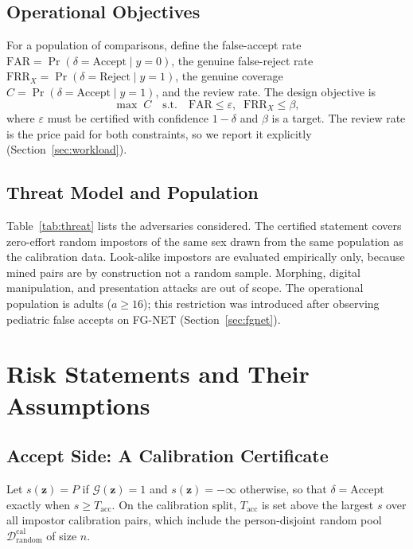 \documentclass[journal]{IEEEtran}
\newcommand{\vect}[1]{\mathbf{#1}}
\begin{document}
\subsection{Operational Objectives}
For a population of comparisons, define the false-accept rate $\text{FAR}=\Pr(\delta=\text{Accept}\mid y=0)$, the genuine false-reject rate $\text{FRR}_X=\Pr(\delta=\text{Reject}\mid y=1)$, the genuine coverage $C=\Pr(\delta=\text{Accept}\mid y=1)$, and the review rate. The design objective is
\begin{equation}
\label{eq:objective}
\max\; C \quad \text{s.t.}\quad \text{FAR}\le\varepsilon,\;\; \text{FRR}_X\le\beta ,
\end{equation}
where $\varepsilon$ must be certified with confidence $1-\delta$ and $\beta$ is a target. The review rate is the price paid for both constraints, so we report it explicitly (Section~\ref{sec:workload}).

\subsection{Threat Model and Population}
Table~\ref{tab:threat} lists the adversaries considered. The certified statement covers zero-effort random impostors of the same sex drawn from the same population as the calibration data. Look-alike impostors are evaluated empirically only, because mined pairs are by construction not a random sample. Morphing, digital manipulation, and presentation attacks are out of scope. The operational population is adults ($a\ge16$); this restriction was introduced after observing pediatric false accepts on FG-NET (Section~\ref{sec:fgnet}).



\section{Risk Statements and Their Assumptions}
\label{sec:risk}

\subsection{Accept Side: A Calibration Certificate}
Let $s(\vect{z})=P$ if $\mathcal{G}(\vect{z})=1$ and $s(\vect{z})=-\infty$ otherwise, so that $\delta=\text{Accept}$ exactly when $s\ge T_{\text{acc}}$. On the calibration split, $T_{\text{acc}}$ is set above the largest $s$ over all impostor calibration pairs, which include the person-disjoint random pool $\mathcal{D}^{\text{cal}}_{\text{random}}$ of size $n$.
\end{document}
